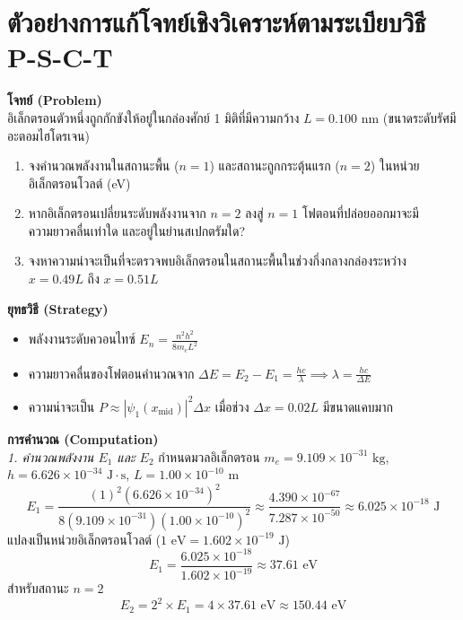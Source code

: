 \section{ตัวอย่างการแก้โจทย์เชิงวิเคราะห์ตามระเบียบวิธี P-S-C-T}

\begin{psctexample}
\textbf{โจทย์ (Problem)} \\
อิเล็กตรอนตัวหนึ่งถูกกักขังให้อยู่ในกล่องศักย์ 1 มิติที่มีความกว้าง $L = 0.100\text{ nm}$ (ขนาดระดับรัศมีอะตอมไฮโดรเจน) 
\begin{enumerate}
    \item จงคำนวณพลังงานในสถานะพื้น ($n=1$) และสถานะถูกกระตุ้นแรก ($n=2$) ในหน่วยอิเล็กตรอนโวลต์ (eV)
    \item หากอิเล็กตรอนเปลี่ยนระดับพลังงานจาก $n=2$ ลงสู่ $n=1$ โฟตอนที่ปล่อยออกมาจะมีความยาวคลื่นเท่าใด และอยู่ในย่านสเปกตรัมใด?
    \item จงหาความน่าจะเป็นที่จะตรวจพบอิเล็กตรอนในสถานะพื้นในช่วงกึ่งกลางกล่องระหว่าง $x = 0.49L$ ถึง $x = 0.51L$
\end{enumerate}

\textbf{ยุทธวิธี (Strategy)} \\
\begin{itemize}
    \item พลังงานระดับควอนไทซ์ $E_n = \frac{n^2 h^2}{8m_e L^2}$
    \item ความยาวคลื่นของโฟตอนคำนวณจาก $\Delta E = E_2 - E_1 = \frac{hc}{\lambda} \implies \lambda = \frac{hc}{\Delta E}$
    \item ความน่าจะเป็น $P \approx |\psi_1(x_{\text{mid}})|^2 \Delta x$ เมื่อช่วง $\Delta x = 0.02L$ มีขนาดแคบมาก
\end{itemize}

\textbf{การคำนวณ (Computation)} \\
\textit{1. คำนวณพลังงาน $E_1$ และ $E_2$}
กำหนดมวลอิเล็กตรอน $m_e = 9.109 \times 10^{-31}\text{ kg}$, $h = 6.626 \times 10^{-34}\text{ J}\cdot\text{s}$, $L = 1.00 \times 10^{-10}\text{ m}$
\begin{equation}
E_1 = \frac{(1)^2 (6.626 \times 10^{-34})^2}{8 (9.109 \times 10^{-31}) (1.00 \times 10^{-10})^2} \approx \frac{4.390 \times 10^{-67}}{7.287 \times 10^{-50}} \approx 6.025 \times 10^{-18}\text{ J}
\end{equation}
แปลงเป็นหน่วยอิเล็กตรอนโวลต์ ($1\text{ eV} = 1.602 \times 10^{-19}\text{ J}$)
\begin{equation}
E_1 = \frac{6.025 \times 10^{-18}}{1.602 \times 10^{-19}} \approx 37.61\text{ eV}
\end{equation}
สำหรับสถานะ $n=2$
\begin{equation}
E_2 = 2^2 \times E_1 = 4 \times 37.61\text{ eV} \approx 150.44\text{ eV}
\end{equation}


\end{psctexample}
